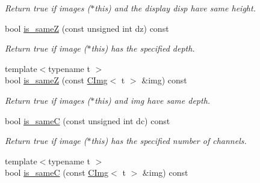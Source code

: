 \begin{DoxyCompactItemize}
\begin{DoxyCompactList}\small\item\em Return {\ttfamily true} if images {\ttfamily }($\ast$this) and the display {\ttfamily disp} have same height. \item\end{DoxyCompactList}\item 
\hypertarget{structcimg__library_1_1CImg_aae8da1879332cbb3807133b552d1cafe}{
bool \hyperlink{structcimg__library_1_1CImg_aae8da1879332cbb3807133b552d1cafe}{is\_\-sameZ} (const unsigned int dz) const }
\label{structcimg__library_1_1CImg_aae8da1879332cbb3807133b552d1cafe}

\begin{DoxyCompactList}\small\item\em Return {\ttfamily true} if image ($\ast$this) has the specified depth. \item\end{DoxyCompactList}\item 
\hypertarget{structcimg__library_1_1CImg_a56f92c4b59cbe1b73cf628e43203f516}{
{\footnotesize template$<$typename t $>$ }\\bool \hyperlink{structcimg__library_1_1CImg_a56f92c4b59cbe1b73cf628e43203f516}{is\_\-sameZ} (const \hyperlink{structcimg__library_1_1CImg}{CImg}$<$ t $>$ \&img) const }
\label{structcimg__library_1_1CImg_a56f92c4b59cbe1b73cf628e43203f516}

\begin{DoxyCompactList}\small\item\em Return {\ttfamily true} if images {\ttfamily }($\ast$this) and {\ttfamily img} have same depth. \item\end{DoxyCompactList}\item 
\hypertarget{structcimg__library_1_1CImg_a0d951e0f61a46bcdafcd034b90812885}{
bool \hyperlink{structcimg__library_1_1CImg_a0d951e0f61a46bcdafcd034b90812885}{is\_\-sameC} (const unsigned int dc) const }
\label{structcimg__library_1_1CImg_a0d951e0f61a46bcdafcd034b90812885}

\begin{DoxyCompactList}\small\item\em Return {\ttfamily true} if image ($\ast$this) has the specified number of channels. \item\end{DoxyCompactList}\item 
\hypertarget{structcimg__library_1_1CImg_a1d0a9843c76800243f0ac3a140dcd7e1}{
{\footnotesize template$<$typename t $>$ }\\bool \hyperlink{structcimg__library_1_1CImg_a1d0a9843c76800243f0ac3a140dcd7e1}{is\_\-sameC} (const \hyperlink{structcimg__library_1_1CImg}{CImg}$<$ t $>$ \&img) const }
\label{structcimg__library_1_1CImg_a1d0a9843c76800243f0ac3a140dcd7e1}


\end{DoxyCompactItemize}
